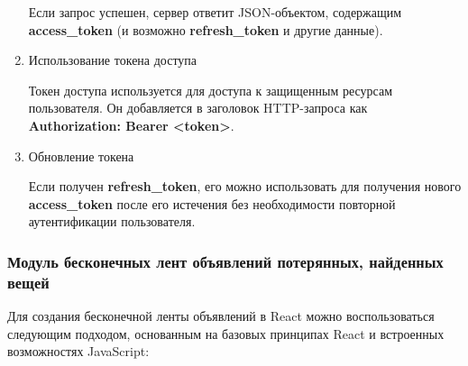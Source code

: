\begin{enumerate}
\begin{itemize}
	\end{itemize}
	
	Если запрос успешен, сервер ответит JSON-объектом, содержащим \textbf{access\_token} (и возможно \textbf{refresh\_token} и другие данные).
	
	\item Использование токена доступа
	
	Токен доступа используется для доступа к защищенным ресурсам пользователя. Он добавляется в заголовок HTTP-запроса как \textbf{Authorization: Bearer <token>}.
	
	\item Обновление токена
	
	Если получен \textbf{refresh\_token}, его можно использовать для получения нового \textbf{access\_token} после его истечения без необходимости повторной аутентификации пользователя.
	
\end{enumerate}


\subsubsection{Модуль бесконечных лент объявлений потерянных, найденных вещей}

Для создания бесконечной ленты объявлений в React можно воспользоваться следующим подходом, основанным на базовых принципах React и встроенных возможностях JavaScript:

